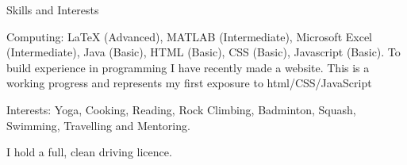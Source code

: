 \documentclass{resume} %
\begin{document}
\iffalse
\begin{rSection}{Achievements}

\begin{sSubsection}{}{}{}{}
\item Sixth Form Physics Cup (2012)
\item Sixth Form Mathematics Prize (2011)
\end{sSubsection}

\end{rSection}
\fi
\begin{rSection}{Skills and Interests}
\item Computing: LaTeX (Advanced), MATLAB (Intermediate), Microsoft Excel (Intermediate), Java (Basic), HTML (Basic), CSS (Basic), Javascript (Basic). To build experience in programming I have recently made a website. This is a working progress and represents my first exposure to html/CSS/JavaScript
\item Interests: Yoga, Cooking, Reading, Rock Climbing, Badminton, Squash, Swimming, Travelling and Mentoring.
\item I hold a full, clean driving licence.

\end{rSection}




\end{document}
